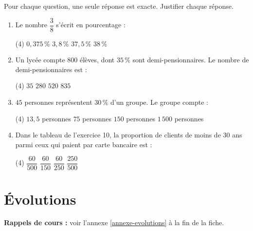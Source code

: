 \documentclass[10pt,a4paper]{article}
\begin{document}
\begin{bloc}
\begin{exo}[QCM][bac]
Pour chaque question, une seule réponse est exacte. Justifier chaque réponse.
\begin{enumerate}[leftmargin=*]
    \item Le nombre \(\dfrac{3}{8}\) s'écrit en pourcentage :
    \begin{tasks}(4)
        \task \(0,375\,\%\)
        \task \(3,8\,\%\)
        \task \(37,5\,\%\)
        \task \(38\,\%\)
    \end{tasks}
    \item Un lycée compte \(800\) élèves, dont \(35\,\%\) sont demi-pensionnaires. Le nombre de demi-pensionnaires est :
    \begin{tasks}(4)
        \task \(35\)
        \task \(280\)
        \task \(520\)
        \task \(835\)
    \end{tasks}
    \item \(45\) personnes représentent \(30\,\%\) d'un groupe. Le groupe compte :
    \begin{tasks}(4)
        \task \(13,5\) personnes
        \task \(75\) personnes
        \task \(150\) personnes
        \task \(1\,500\) personnes
    \end{tasks}
    \item Dans le tableau de l'exercice 10, la proportion de clients de moins de 30 ans parmi ceux qui paient par carte bancaire est :
    \begin{tasks}(4)
        \task \(\dfrac{60}{500}\)
        \task \(\dfrac{60}{150}\)
        \task \(\dfrac{60}{250}\)
        \task \(\dfrac{250}{500}\)
    \end{tasks}
\end{enumerate}
\end{exo}
\end{bloc}


\section{Évolutions}

\textbf{Rappels de cours :} voir l'annexe \ref{annexe-evolutions} à la fin de la fiche.
\nopagebreak
\end{document}
